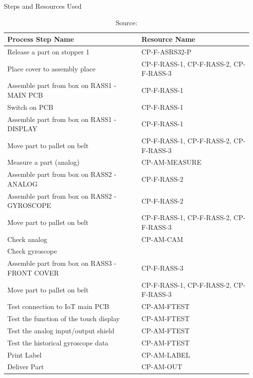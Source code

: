 \begin{table}[H]
  \centering
  \footnotesize
  \caption[Production Steps and Resources]{Steps and Resources Used}
  \label{tab:description-resources}
  \begin{tabular}{@{}p{}p{}@{}}
    \toprule
    \textbf{Process Step Name}                    & \textbf{Resource Name}                \\
    \midrule
    Release a part on stopper 1                   & CP-F-ASRS32-P                         \\
    Place cover to assembly place                 & CP-F-RASS-1, CP-F-RASS-2, CP-F-RASS-3 \\
    Assemble part from box on RASS1 - MAIN PCB    & CP-F-RASS-1                           \\
    Switch on PCB                                 & CP-F-RASS-1                           \\
    Assemble part from box on RASS1 - DISPLAY     & CP-F-RASS-1                           \\
    Move part to pallet on belt                   & CP-F-RASS-1, CP-F-RASS-2, CP-F-RASS-3 \\
    Measure a part (analog)                       & CP-AM-MEASURE                         \\
    Assemble part from box on RASS2 - ANALOG      & CP-F-RASS-2                           \\
    Assemble part from box on RASS2 - GYROSCOPE   & CP-F-RASS-2                           \\
    Move part to pallet on belt                   & CP-F-RASS-1, CP-F-RASS-2, CP-F-RASS-3 \\
    Check analog                                  & CP-AM-CAM                             \\
    Check gyroscope                               &                                       \\
    Assemble part from box on RASS3 - FRONT COVER & CP-F-RASS-3                           \\
    Move part to pallet on belt                   & CP-F-RASS-1, CP-F-RASS-2, CP-F-RASS-3 \\
    Test connection to IoT main PCB               & CP-AM-FTEST                           \\
    Test the function of the touch display        & CP-AM-FTEST                           \\
    Test the analog input/output shield           & CP-AM-FTEST                           \\
    Test the historical gyroscope data            & CP-AM-FTEST                           \\
    Print Label                                   & CP-AM-LABEL                           \\
    Deliver Part                                  & CP-AM-OUT                             \\
    \bottomrule
  \end{tabular}
  \caption*{Source: \Textcite{IoTFactory2024}}
\end{table}


